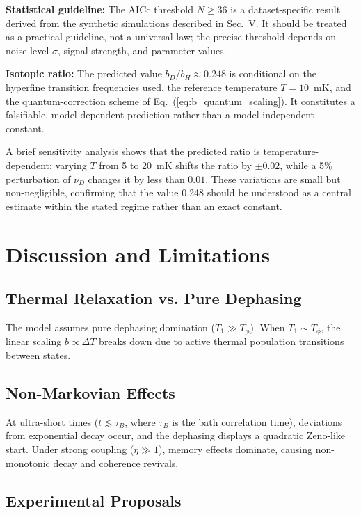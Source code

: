 \documentclass[reprint,amsmath,amssymb,aps,pra,superscriptaddress]{revtex4-2}
\begin{document}
\textbf{Statistical guideline:} The AICc threshold $N \ge 36$ is a dataset-specific result derived from the synthetic simulations described in Sec.~V. It should be treated as a practical guideline, not a universal law; the precise threshold depends on noise level $\sigma$, signal strength, and parameter values.

\textbf{Isotopic ratio:} The predicted value $b_D/b_H \approx 0.248$ is conditional on the hyperfine transition frequencies used, the reference temperature $T = 10$~mK, and the quantum-correction scheme of Eq.~(\ref{eq:b_quantum_scaling}). It constitutes a falsifiable, model-dependent prediction rather than a model-independent constant.

A brief sensitivity analysis shows that the predicted ratio is temperature-dependent: varying $T$ from 5 to 20~mK shifts the ratio by $\pm 0.02$, while a 5\% perturbation of $\nu_D$ changes it by less than $0.01$. These variations are small but non-negligible, confirming that the value 0.248 should be understood as a central estimate within the stated regime rather than an exact constant.

\section{Discussion and Limitations}

\subsection{Thermal Relaxation vs. Pure Dephasing}

The model assumes pure dephasing domination ($T_1 \gg T_{\phi}$). When $T_1 \sim T_{\phi}$, the linear scaling $b \propto \Delta T$ breaks down due to active thermal population transitions between states.

\subsection{Non-Markovian Effects}

At ultra-short times ($t \lesssim \tau_B$, where $\tau_B$ is the bath correlation time), deviations from exponential decay occur, and the dephasing displays a quadratic Zeno-like start. Under strong coupling ($\eta \gg 1$), memory effects dominate, causing non-monotonic decay and coherence revivals.

\subsection{Experimental Proposals}
\end{document}
